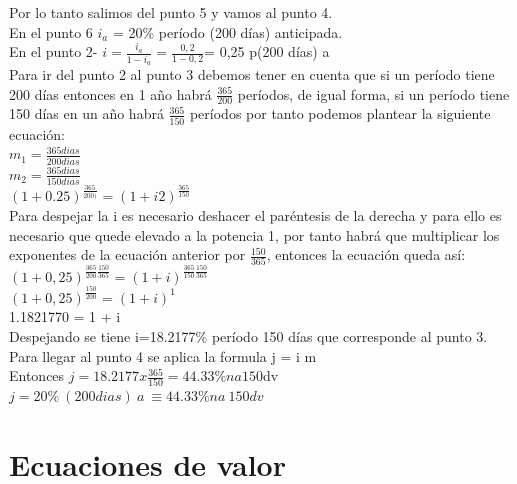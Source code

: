 Por lo tanto salimos del punto 5 y vamos al punto 4.\\

En el punto 6 $i_{a}$ = 20\% período  (200 días) anticipada.\\

En el punto 2- $i = \frac{i_{a}}{1-i_{a}} = \frac{0,2}{1-0,2} $= 0,25 p(200 días) a\\

Para ir del punto 2 al punto 3 debemos tener en cuenta que si un período tiene 200 días entonces en 1 año habrá $\frac{365}{200}$ períodos, de igual forma, si un período tiene 150 días en un año habrá $\frac{365}{150}$ períodos por tanto podemos plantear la siguiente ecuación:\\

$m_{1}= \frac{365dias}{200dias}$\\

$m_{2} = \frac{365dias}{150dias}$\\

$(1 + 0.25)^{\frac{365}{200)}} = (1 + i2)^{\frac{365}{150}}$\\


Para despejar la i es necesario deshacer el paréntesis de la derecha y para ello es necesario que quede elevado a la potencia 1, por tanto habrá que multiplicar los exponentes de la ecuación anterior por $\frac{150}{365}$, entonces la ecuación queda así:\\ 

$(1 + 0,25)^{\frac{365}{200}\frac{150}{365}} = (1+i)^{\frac{365}{150}\frac{150}{365}}$\\

$(1 + 0,25)^{\frac{150}{200}} = (1 + i)^1 $\\

1.1821770 = 1 + i\\

Despejando se tiene i=18.2177\% período 150 días que corresponde al punto 3.
Para llegar al punto 4 se aplica la formula j = i m\\

Entonces $j = 18.2177 x \frac{365}{150} = 44.33 \%na 150$dv\\

$j = 20\%\ (200dias)\ a\ \equiv 44.33\%na\ 150dv$

\section{Ecuaciones de valor}

